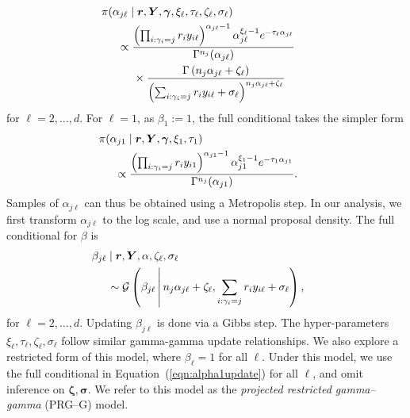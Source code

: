 \documentclass[iicol,sn-basic]{sn-jnl}
\newcommand{\bigmid}{\,\middle\vert\,}
\theoremstyle{thmstyleone}
\begin{document}
\begin{equation}
\label{eqn:alphalupdate}
\begin{aligned}
&\hspace{-0.5cm}\pi(\alpha_{j\ell}\mid \bm{r},\bm{Y},\bm{\gamma},\xi_\ell,\tau_\ell,\zeta_\ell,\sigma_\ell) \\
&\propto \frac{\left(\prod_{i:\gamma_i = j}r_iy_{i\ell}\right)^{\alpha_{j\ell} - 1}\alpha_{j\ell}^{\xi_\ell - 1}e^{-\tau_\ell \alpha_{j\ell}}}{\Gamma^{n_j}(\alpha_{j\ell})} \\
&\hspace{0.5cm}\times \frac{\Gamma\left(n_j\alpha_{j\ell} + \zeta_{\ell}\right)}{\left(\sum_{i:\gamma_i = j}r_iy_{i\ell} + \sigma_{\ell}\right)^{n_j\alpha_{j\ell} + \zeta_{\ell}}}
\end{aligned}
\end{equation}
for $\ell = 2,\ldots,d$.  For $\ell = 1$, as $\beta_{1} := 1$, the full conditional takes the simpler form
\begin{equation}
\label{eqn:alpha1update}
\begin{aligned}
&\hspace{-0.5cm}\pi(\alpha_{j1}\mid\bm{r},\bm{Y},\bm{\gamma},\xi_1,\tau_1) \\
&\propto \frac{\left(\prod_{i:\gamma_i = j}r_iy_{i1}\right)^{\alpha_{j1} - 1}\alpha_{j1}^{\xi_1 - 1}e^{-\tau_1\alpha_{j1}}}{\Gamma^{n_j}(\alpha_{j1})}.
\end{aligned}
\end{equation}
Samples of $\alpha_{j\ell}$ can thus be obtained using a Metropolis step. In our analysis, we first transform $\alpha_{j\ell}$ to the log scale, and use a normal proposal density.  The full conditional for $\beta$ is
\begin{equation}
\label{eqn:betafc}
\begin{aligned}
&\hspace{-0.5cm}\beta_{j\ell}\mid\bm{r},\bm{Y},\alpha,\zeta_{\ell},\sigma_{\ell} \\
&\sim \mathcal{G}\left(\beta_{j\ell}\bigmid n_j\alpha_{j\ell} + \zeta_\ell, \sum_{i:\gamma_i = j}r_iy_{i\ell} + \sigma_{\ell}\right),
\end{aligned}
\end{equation}
for $\ell = 2,\ldots, d$.  Updating $\beta_{j\ell}$ is done via a Gibbs step.  The hyper-parameters $\xi_{\ell},\tau_{\ell},\zeta_{\ell},\sigma_{\ell}$ follow similar gamma-gamma update relationships.  We also explore a restricted form of this model, where $\beta_{\ell} = 1$ for all $\ell$.  Under this model, we use the full conditional in Equation~(\ref{eqn:alpha1update}) for all $\ell$, and omit inference on $\bm{\zeta},\bm{\sigma}$.  We refer to this model as the \emph{projected restricted gamma--gamma} (PRG--G) model.
\end{document}
